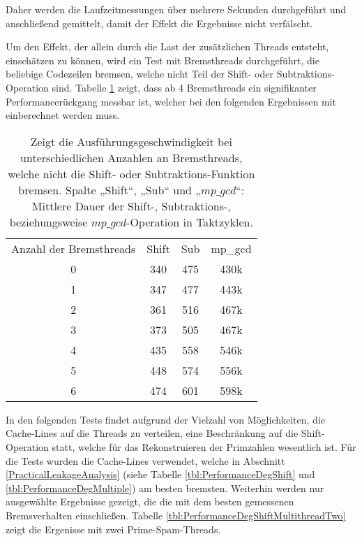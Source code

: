 Daher werden die Laufzeitmessungen über mehrere Sekunden durchgeführt und anschließend gemittelt, damit der Effekt die Ergebnisse nicht verfälscht.

Um den Effekt, der allein durch die Last der zusätzlichen Threads entsteht, einschätzen zu können, wird ein Test mit Bremsthreads durchgeführt, die beliebige Codezeilen bremsen, welche nicht Teil der Shift- oder Subtraktions-Operation sind.
Tabelle \ref{tbl:PrimeSpamMultithreadRef} zeigt, dass ab 4 Bremsthreads ein signifikanter Performancerückgang messbar ist, welcher bei den folgenden Ergebnissen mit einberechnet werden muss.

\begin{table}[h]
\caption{Zeigt die Ausführungsgeschwindigkeit bei unterschiedlichen Anzahlen an Bremsthreads, welche nicht die Shift- oder Subtraktions-Funktion bremsen. Spalte „Shift“, „Sub“ und „$mp\_gcd$“: Mittlere Dauer der Shift-, Subtraktions-, beziehungsweise $mp\_gcd$-Operation in Taktzyklen.}
\label{tbl:PrimeSpamMultithreadRef}
\begin{tabular}{cccc}
Anzahl der Bremsthreads & Shift & Sub & mp\_gcd \\
0                      & 340   & 475 & 430k    \\
1                      & 347   & 477 & 443k    \\
2                      & 361   & 516 & 467k    \\
3                      & 373   & 505 & 467k    \\
4                      & 435   & 558 & 546k    \\
5                      & 448   & 574 & 556k    \\
6                      & 474   & 601 & 598k   
\end{tabular}
\end{table}

In den folgenden Tests findet aufgrund der Vielzahl von Möglichkeiten, die Cache-Lines auf die Threads zu verteilen, eine Beschränkung auf die Shift-Operation statt, welche für das Rekonstruieren der Primzahlen wesentlich ist.
Für die Tests wurden die Cache-Lines verwendet, welche in Abschnitt \ref{PracticalLeakageAnalysis} (siehe Tabelle \ref{tbl:PerformanceDegShift} und \ref{tbl:PerformanceDegMultiple}) am besten bremsten.
Weiterhin werden nur ausgewählte Ergebnisse gezeigt, die die mit dem besten gemessenen Bremsverhalten einschließen.
Tabelle \ref{tbl:PerformanceDegShiftMultithreadTwo} zeigt die Ergenisse mit zwei Prime-Spam-Threads.

